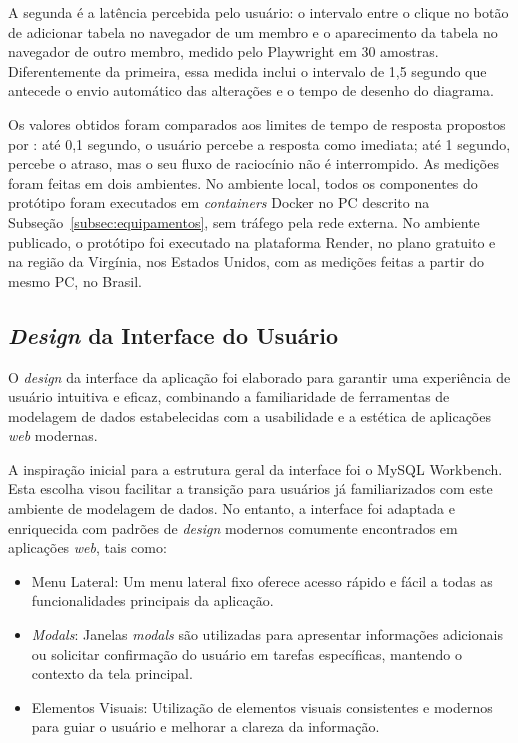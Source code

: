 A segunda é a latência percebida pelo usuário: o intervalo entre o clique no botão de adicionar tabela no navegador de um membro e o aparecimento da tabela no navegador de outro membro, medido pelo Playwright em 30 amostras. Diferentemente da primeira, essa medida inclui o intervalo de 1,5 segundo que antecede o envio automático das alterações e o tempo de desenho do diagrama.

Os valores obtidos foram comparados aos limites de tempo de resposta propostos por : até 0,1 segundo, o usuário percebe a resposta como imediata; até 1 segundo, percebe o atraso, mas o seu fluxo de raciocínio não é interrompido. As medições foram feitas em dois ambientes. No ambiente local, todos os componentes do protótipo foram executados em \textit{containers} Docker no PC descrito na Subseção~\ref{subsec:equipamentos}, sem tráfego pela rede externa. No ambiente publicado, o protótipo foi executado na plataforma Render, no plano gratuito e na região da Virgínia, nos Estados Unidos, com as medições feitas a partir do mesmo PC, no Brasil.

\subsection[\textit{Design} da Interface do Usuário]{\textit{Design} da Interface do Usuário}
O \textit{design} da interface da aplicação foi elaborado para garantir uma experiência de usuário intuitiva e eficaz, combinando a familiaridade de ferramentas de modelagem de dados estabelecidas com a usabilidade e a estética de aplicações \textit{web} modernas.

A inspiração inicial para a estrutura geral da interface foi o MySQL Workbench. Esta escolha visou facilitar a transição para usuários já familiarizados com este ambiente de modelagem de dados. No entanto, a interface foi adaptada e enriquecida com padrões de \textit{design} modernos comumente encontrados em aplicações \textit{web}, tais como:

\begin{itemize}
    \item Menu Lateral: Um menu lateral fixo oferece acesso rápido e fácil a todas as funcionalidades principais da aplicação.
    \item \textit{Modals}: Janelas \textit{modals} são utilizadas para apresentar informações adicionais ou solicitar confirmação do usuário em tarefas específicas, mantendo o contexto da tela principal.
    \item Elementos Visuais: Utilização de elementos visuais consistentes e modernos para guiar o usuário e melhorar a clareza da informação.
\end{itemize}

